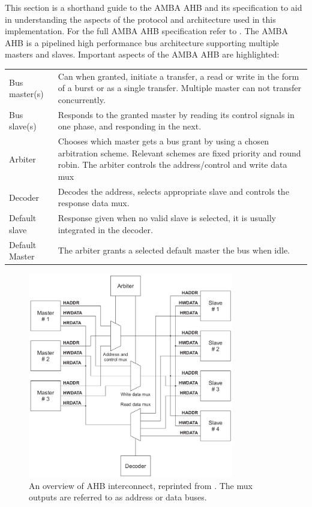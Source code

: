 This section is a shorthand guide to the AMBA AHB and its specification to aid in understanding the aspects of the protocol and architecture used in this implementation. For the full AMBA AHB specification refer to \cite{amba}. The AMBA AHB is a pipelined high performance bus architecture supporting multiple masters and slaves. Important aspects of the AMBA AHB are highlighted:

\begin{tabular}{p{3cm} p{10cm}}
Bus master(s) & Can when granted, initiate a transfer, a read or write in the form of a burst or as a single transfer. Multiple master can not transfer concurrently. \\
Bus slave(s) & Responds to the granted master by reading its control signals in one phase, and responding in the next. \\
Arbiter & Chooses which master gets a bus grant by using a chosen arbitration scheme. Relevant schemes are fixed priority and round robin. The arbiter controls the address/control and write data mux \\
Decoder & Decodes the address, selects appropriate slave and controls the response data mux. \\
Default slave & Response given when no valid slave is selected, it is usually integrated in the decoder.\\
Default Master & The arbiter grants a selected default master the bus when idle. \\
\end{tabular}


\begin{figure}[hbt]
    \begin{center}
        \includegraphics[width=0.8\textwidth]{figs/AHB/AHB_connections.png}
    \end{center}
    \caption{An overview of AHB interconnect, reprinted from \cite{amba}. The mux outputs are referred to as address or data buses.}
    \label{fig:interc}
\end{figure}

